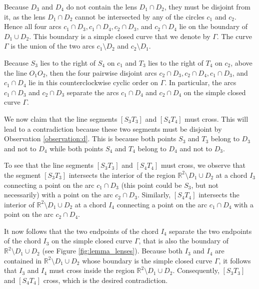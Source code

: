 \documentclass[11pt,a4paper]{article}
\newcommand{\bbox}{\vrule height7pt width4pt depth1pt}
\begin{document}
Because $D_{3}$ and $D_{4}$ do not contain the lens $D_{1} \cap D_{2}$, they must be disjoint from it, as the lens $D_{1} \cap D_{2}$ cannot be intersected by any of the circles $c_{1}$ and $c_{2}$. Hence all four arcs $c_{1} \cap D_{3}, c_{1} \cap D_{4}, c_{2} \cap D_{3}$, and $c_{2} \cap D_{4}$
lie on the boundary of
$D_{1} \cup D_{2}$. This boundary is a simple closed curve that we denote by $\Gamma$. The curve $\Gamma$ is the union of the two arcs $c_{1} \setminus D_{2}$ and $c_{2} \setminus D_{1}$. 

Because $S_{3}$ lies to the right of $S_{4}$ on $c_{1}$
and $T_{3}$ lies to the right of $T_{4}$ on $c_{2}$, above the line $O_{1}O_{2}$, then 
the four pairwise disjoint arcs
$c_{2} \cap D_{3}, c_{2} \cap D_{4}, c_{1} \cap D_{3}$, and $c_{1} \cap D_{4}$ lie in this  counterclockwise cyclic order on $\Gamma$.
In particular, the arcs $c_{1} \cap D_{3}$ and $c_{2} \cap D_{3}$ separate the arcs
$c_{1} \cap D_{4}$ and $c_{2} \cap D_{4}$ on the simple closed curve $\Gamma$.

We now claim that the line segments $[S_{3}T_{3}]$ and $[S_{4}T_{4}]$
must cross. This will lead to a contradiction 
because these two segments must be disjoint
by Observation \ref{observation:d}. This is because both points
$S_{3}$ and $T_{3}$ belong to $D_{3}$ and not to $D_{4}$ while both points $S_{4}$ and $T_{4}$
belong to $D_{4}$ and not to $D_{3}$.

To see that the line segments $[S_{3}T_{3}]$ and $[S_{4}T_{4}]$
must cross, we observe that the segment 
$[S_{3}T_{3}]$ intersects the interior of the region 
$\mathbb{R}^2 \setminus D_{1} \cup D_{2}$ at a chord $I_{3}$
connecting a point on the arc $c_{1} \cap D_{3}$ (this point could be $S_{3}$, but 
not necessarily) with a point on the arc $c_{2} \cap D_{3}$. 
Similarly, $[S_{4}T_{4}]$ intersects 
the interior of  
$\mathbb{R}^2 \setminus D_{1} \cup D_{2}$ at a chord $I_{4}$
connecting a point on the arc $c_{1} \cap D_{4}$ with a point on the arc
$c_{2} \cap D_{4}$. 

It now follows that the two endpoints of the chord $I_{4}$
separate the two endpoints of the chord $I_{3}$ on the simple closed curve $\Gamma$, that is also the boundary of $\mathbb{R}^2 \setminus D_{1} \cup D_{2}$ (see Figure \ref{fig:lemma_lenses}).
Because both $I_{3}$ and $I_{4}$ are contained in $\mathbb{R}^2 \setminus D_{1} \cup D_{2}$ whose boundary is the simple closed curve $\Gamma$, 
it follows that $I_{3}$ and $I_{4}$
must cross inside the region $\mathbb{R}^2 \setminus D_{1} \cup D_{2}$. Consequently, $[S_{3}T_{3}]$ and $[S_{4}T_{4}]$ cross, which is the desired contradiction.
\bbox
\end{document}

